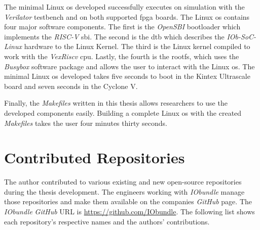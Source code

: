 The minimal Linux \acrshort{os} developed successfully executes on simulation with the \textit{Verilator} testbench and on both supported \acrshort{fpga} boards. The Linux \acrshort{os} contains four major software components. The first is the \textit{OpenSBI} bootloader which implements the \textit{RISC-V} \acrshort{sbi}. The second is the \acrlong{dtb} which describes the \textit{IOb-SoC-Linux} hardware to the Linux Kernel. The third is the Linux kernel compiled to work with the \textit{VexRiscv} \acrshort{cpu}. Lastly, the fourth is the \acrlong{rootfs}, which uses the \textit{Busybox} software package and allows the user to interact with the Linux \acrshort{os}. The minimal Linux \acrshort{os} developed takes five seconds to boot in the Kintex Ultrascale board and seven seconds in the Cyclone V.

Finally, the \textit{Makefiles} written in this thesis allows researchers to use the developed components easily. Building a complete Linux \acrshort{os} with the created \textit{Makefiles} takes the user four minutes thirty seconds.

\section{Contributed Repositories}
\label{section:contributions}
The author contributed to various existing and new open-source repositories during the thesis development. The engineers working with \textit{IObundle} manage those repositories and make them available on the companies \textit{GitHub} page. The \textit{IObundle} \textit{GitHub} URL is \url{https://github.com/IObundle}. The following list shows each repository's respective names and the authors' contributions.

